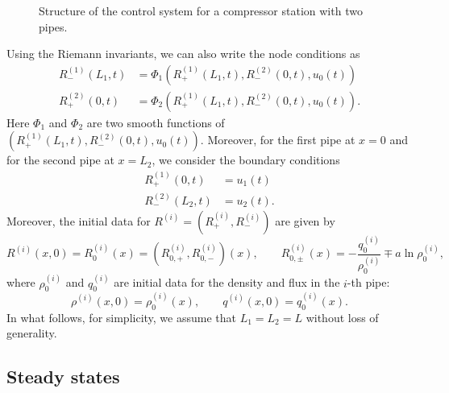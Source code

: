 \documentclass[12pt]{article}
\numberwithin{equation}{section}
\begin{document}
\begin{figure}[h!]
\begin{center}
\end{center}
\caption{Structure of the control system for a compressor station with two pipes.}
\label{fig1}
\end{figure}

Using the Riemann invariants, we can also write the node conditions as 
\begin{align}
    R_-^{(1)}(L_1,t)&=\Phi_1(R_+^{(1)}(L_1,t),R_-^{(2)}(0,t),u_0(t)) \label{gas-RI-eq2}\\[1mm]
    R_+^{(2)}(0,t)&=\Phi_2(R_+^{(1)}(L_1,t),R_-^{(2)}(0,t),u_0(t)). \label{gas-RI-eq3}
\end{align}
Here $\Phi_1$ and $\Phi_2$ are two smooth functions of $(R_+^{(1)}(L_1,t),R_-^{(2)}(0,t),u_0(t))$. Moreover, for the first pipe at $x=0$ and for the second pipe at $x=L_2$, we consider the boundary conditions 
\begin{align}
    R_+^{(1)}(0,t)&=u_1(t)\label{gas-RI-eq4}\\[1mm]
    R_-^{(2)}(L_2,t)&=u_2(t) \label{gas-RI-eq5}.
\end{align}
Moreover, the initial data for $R^{(i)}=(R^{(i)}_+,R^{(i)}_-)$ are given by
\begin{equation}\label{R-initial-data}
    R^{(i)}(x,0)=R^{(i)}_0(x)=(R^{(i)}_{0,+},R^{(i)}_{0,-})(x),\qquad R_{0,\pm}^{(i)}(x) = -\frac{q^{(i)}_0}{\rho^{(i)}_0}\mp a\ln \rho^{(i)}_0,
\end{equation}
where $\rho_0^{(i)}$ and $q_0^{(i)}$ are initial data for the density and flux in the $i$-th pipe:
$$
\rho^{(i)}(x,0)=\rho^{(i)}_0(x),\qquad q^{(i)}(x,0)=q^{(i)}_0(x).
$$
In what follows, for simplicity, we assume that $L_1=L_2=L$ without loss of generality. 

\subsection{Steady states}
\end{document}
